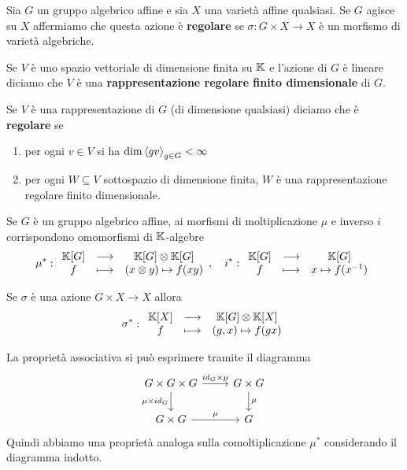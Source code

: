 \begin{definition}
Sia $G$ un gruppo algebrico affine e sia $X$ una variet\`a affine qualsiasi. Se $G$ agisce su $X$ affermiamo che questa azione \`e \textbf{regolare} se $\sigma:G\times X\to X$ \`e un morfismo di variet\`a algebriche.
\end{definition}

\begin{definition}
Se $V$ \`e uno spazio vettoriale di dimensione finita su $\mathbb{K}$ e l'azione di $G$ \`e lineare diciamo che $V$ \`e una \textbf{rappresentazione regolare finito dimensionale} di $G$.

Se $V$ \`e una rappresentazione di $G$ (di dimensione qualsiasi) diciamo che \`e \textbf{regolare} se
\begin{enumerate}
    \item per ogni $v\in V$ si ha $\dim\left\langle {gv}\right\rangle_{g\in G}<\infty$
    \item per ogni $W\subseteq V$ sottospazio di dimensione finita, $W$ \`e una rappresentazione regolare finito dimensionale.
\end{enumerate}
\end{definition}


\begin{remark}
Se $G$ \`e un gruppo algebrico affine, ai morfismi di moltiplicazione $\mu$ e inverso $i$ corrispondono omomorfismi di $\mathbb{K}$-algebre
\[\mu^\ast:\begin{array}{ccc} {\mathbb{K}[G]} & \longrightarrow & {\mathbb{K}[G]\otimes\mathbb{K}[G]}\\ {f} & \longmapsto & {(x\otimes y)\mapsto f(xy)} \end{array},\quad i^\ast:\begin{array}{ccc} {\mathbb{K}[G]} & \longrightarrow & {\mathbb{K}[G]}\\ {f} & \longmapsto & {x\mapsto f(x^{-1})} \end{array}\]
\end{remark}

\begin{remark}
Se $\sigma$ \`e una azione $G\times X\to X$ allora
\[\sigma^\ast:\begin{array}{ccc} {\mathbb{K}[X]} & \longrightarrow & {\mathbb{K}[G]\otimes\mathbb{K}[X]}\\ {f} & \longmapsto & {(g,x)\mapsto f(gx)} \end{array}\]
\end{remark}


\begin{remark}
La propriet\`a associativa si pu\`o esprimere tramite il diagramma
\[\begin{tikzcd}
	{G\times G\times G} & {G\times G} \\
	{G\times G} & G
	\arrow["{id_G\times\mu}", from=1-1, to=1-2]
	\arrow["{\mu\times id_G}"', from=1-1, to=2-1]
	\arrow["\mu", from=1-2, to=2-2]
	\arrow["\mu", from=2-1, to=2-2]
\end{tikzcd}\]
Quindi abbiamo una propriet\`a analoga sulla comoltiplicazione $\mu^\ast$ considerando il diagramma indotto.
\end{remark}

